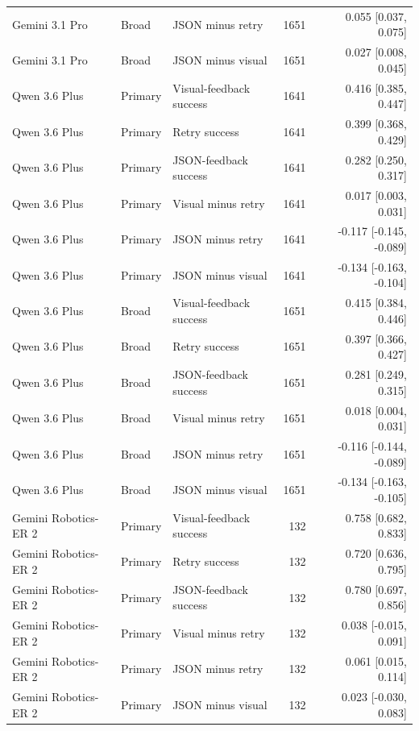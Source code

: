 \begin{tabular}{lllrr}
Gemini 3.1 Pro & Broad & JSON minus retry & 1651 & 0.055 [0.037, 0.075] \\
Gemini 3.1 Pro & Broad & JSON minus visual & 1651 & 0.027 [0.008, 0.045] \\
Qwen 3.6 Plus & Primary & Visual-feedback success & 1641 & 0.416 [0.385, 0.447] \\
Qwen 3.6 Plus & Primary & Retry success & 1641 & 0.399 [0.368, 0.429] \\
Qwen 3.6 Plus & Primary & JSON-feedback success & 1641 & 0.282 [0.250, 0.317] \\
Qwen 3.6 Plus & Primary & Visual minus retry & 1641 & 0.017 [0.003, 0.031] \\
Qwen 3.6 Plus & Primary & JSON minus retry & 1641 & -0.117 [-0.145, -0.089] \\
Qwen 3.6 Plus & Primary & JSON minus visual & 1641 & -0.134 [-0.163, -0.104] \\
Qwen 3.6 Plus & Broad & Visual-feedback success & 1651 & 0.415 [0.384, 0.446] \\
Qwen 3.6 Plus & Broad & Retry success & 1651 & 0.397 [0.366, 0.427] \\
Qwen 3.6 Plus & Broad & JSON-feedback success & 1651 & 0.281 [0.249, 0.315] \\
Qwen 3.6 Plus & Broad & Visual minus retry & 1651 & 0.018 [0.004, 0.031] \\
Qwen 3.6 Plus & Broad & JSON minus retry & 1651 & -0.116 [-0.144, -0.089] \\
Qwen 3.6 Plus & Broad & JSON minus visual & 1651 & -0.134 [-0.163, -0.105] \\
Gemini Robotics-ER 2 & Primary & Visual-feedback success & 132 & 0.758 [0.682, 0.833] \\
Gemini Robotics-ER 2 & Primary & Retry success & 132 & 0.720 [0.636, 0.795] \\
Gemini Robotics-ER 2 & Primary & JSON-feedback success & 132 & 0.780 [0.697, 0.856] \\
Gemini Robotics-ER 2 & Primary & Visual minus retry & 132 & 0.038 [-0.015, 0.091] \\
Gemini Robotics-ER 2 & Primary & JSON minus retry & 132 & 0.061 [0.015, 0.114] \\
Gemini Robotics-ER 2 & Primary & JSON minus visual & 132 & 0.023 [-0.030, 0.083] \\
\bottomrule
\end{tabular}
